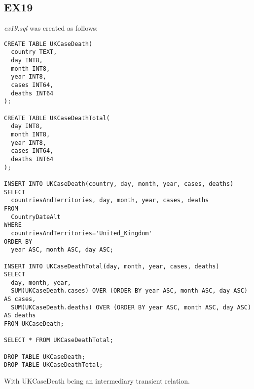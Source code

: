 \documentclass{article}
\begin{document}
\subsection{EX19}
\textit{ex19.sql} was created as follows: 
\begin{verbatim}
CREATE TABLE UKCaseDeath(
  country TEXT,
  day INT8,
  month INT8,
  year INT8,
  cases INT64,
  deaths INT64
);

CREATE TABLE UKCaseDeathTotal(
  day INT8,
  month INT8,
  year INT8,
  cases INT64,
  deaths INT64
);

INSERT INTO UKCaseDeath(country, day, month, year, cases, deaths)
SELECT
  countriesAndTerritories, day, month, year, cases, deaths
FROM
  CountryDateAlt
WHERE
  countriesAndTerritories='United_Kingdom'
ORDER BY
  year ASC, month ASC, day ASC;

INSERT INTO UKCaseDeathTotal(day, month, year, cases, deaths)
SELECT
  day, month, year,
  SUM(UKCaseDeath.cases) OVER (ORDER BY year ASC, month ASC, day ASC) AS cases,
  SUM(UKCaseDeath.deaths) OVER (ORDER BY year ASC, month ASC, day ASC) AS deaths
FROM UKCaseDeath;

SELECT * FROM UKCaseDeathTotal;

DROP TABLE UKCaseDeath;
DROP TABLE UKCaseDeathTotal;
\end{verbatim}
With UKCaseDeath being an intermediary transient relation. 
\end{document}

